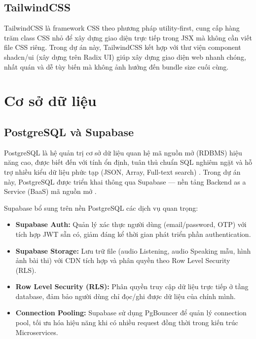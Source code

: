\documentclass[a4paper,12pt]{extreport}
\begin{document}
\subsection{TailwindCSS}

TailwindCSS là framework CSS theo phương pháp utility-first, cung cấp hàng trăm class CSS nhỏ để xây dựng giao diện trực tiếp trong JSX mà không cần viết file CSS riêng. Trong dự án này, TailwindCSS kết hợp với thư viện component shadcn/ui (xây dựng trên Radix UI) giúp xây dựng giao diện web nhanh chóng, nhất quán và dễ tùy biến mà không ảnh hưởng đến bundle size cuối cùng.

\section{Cơ sở dữ liệu}

\subsection{PostgreSQL và Supabase}

PostgreSQL là hệ quản trị cơ sở dữ liệu quan hệ mã nguồn mở (RDBMS) hiệu năng cao, được biết đến với tính ổn định, tuân thủ chuẩn SQL nghiêm ngặt và hỗ trợ nhiều kiểu dữ liệu phức tạp (JSON, Array, Full-text search) \cite{postgresql-docs}. Trong dự án này, PostgreSQL được triển khai thông qua Supabase — nền tảng Backend as a Service (BaaS) mã nguồn mở \cite{supabase-docs}.

Supabase bổ sung trên nền PostgreSQL các dịch vụ quan trọng:

\begin{itemize}
    \item \textbf{Supabase Auth:} Quản lý xác thực người dùng (email/password, OTP) với tích hợp JWT sẵn có, giảm đáng kể thời gian phát triển phần authentication.
    \item \textbf{Supabase Storage:} Lưu trữ file (audio Listening, audio Speaking mẫu, hình ảnh bài thi) với CDN tích hợp và phân quyền theo Row Level Security (RLS).
    \item \textbf{Row Level Security (RLS):} Phân quyền truy cập dữ liệu trực tiếp ở tầng database, đảm bảo người dùng chỉ đọc/ghi được dữ liệu của chính mình.
    \item \textbf{Connection Pooling:} Supabase sử dụng PgBouncer để quản lý connection pool, tối ưu hóa hiệu năng khi có nhiều request đồng thời trong kiến trúc Microservices.
\end{itemize}
\end{document}
